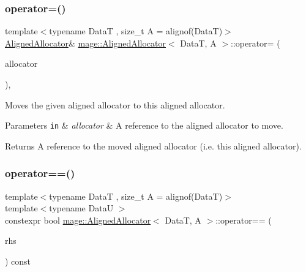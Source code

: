 \subsubsection{\texorpdfstring{operator=()}{operator=()}\hspace{0.1cm}{\footnotesize\ttfamily [2/2]}}
{\footnotesize\ttfamily template$<$typename DataT , size\+\_\+t A = alignof(\+Data\+T)$>$ \\
\mbox{\hyperlink{classmage_1_1_aligned_allocator}{Aligned\+Allocator}}\& \mbox{\hyperlink{classmage_1_1_aligned_allocator}{mage\+::\+Aligned\+Allocator}}$<$ DataT, A $>$\+::operator= (\begin{DoxyParamCaption}\item[{\mbox{\hyperlink{classmage_1_1_aligned_allocator}{Aligned\+Allocator}}$<$ DataT, A $>$ \&\&}]{allocator }\end{DoxyParamCaption})\hspace{0.3cm}{\ttfamily [default]}, {\ttfamily [noexcept]}}

Moves the given aligned allocator to this aligned allocator.


\begin{DoxyParams}[1]{Parameters}
\mbox{\tt in}  & {\em allocator} & A reference to the aligned allocator to move. \\
\hline
\end{DoxyParams}
\begin{DoxyReturn}{Returns}
A reference to the moved aligned allocator (i.\+e. this aligned allocator). 
\end{DoxyReturn}
\mbox{\label{classmage_1_1_aligned_allocator_a64bb29ac780fd5ebdf62f11ab811bff5}} 
\subsubsection{\texorpdfstring{operator==()}{operator==()}}
{\footnotesize\ttfamily template$<$typename DataT , size\+\_\+t A = alignof(\+Data\+T)$>$ \\
template$<$typename DataU $>$ \\
constexpr bool \mbox{\hyperlink{classmage_1_1_aligned_allocator}{mage\+::\+Aligned\+Allocator}}$<$ DataT, A $>$\+::operator== (\begin{DoxyParamCaption}\item[{\mbox{[}\mbox{[}maybe\+\_\+unused\mbox{]} \mbox{]} const \mbox{\hyperlink{classmage_1_1_aligned_allocator}{Aligned\+Allocator}}$<$ DataU, A $>$ \&}]{rhs }\end{DoxyParamCaption}) const\hspace{0.3cm}{\ttfamily [noexcept]}}

